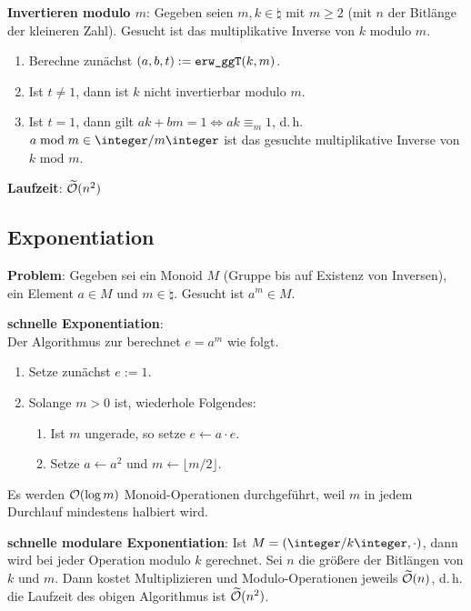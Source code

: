\linie

\textbf{Invertieren modulo $m$}:
Gegeben seien $m, k \in \natural$ mit $m \ge 2$ (mit $n$ der Bitlänge der kleineren Zahl).
Gesucht ist das multiplikative Inverse von $k$ modulo $m$.
\begin{enumerate}
    \item
    Berechne zunächst $(a, b, t) := \texttt{erw\_ggT}(k, m)$.
    
    \item
    Ist $t \not= 1$, dann ist $k$ nicht invertierbar modulo $m$.
    
    \item
    Ist $t = 1$, dann gilt $ak + bm = 1 \iff ak \equiv_m 1$,
    d.\,h. $a \bmod m \in \ZmZ$ ist das gesuchte multiplikative Inverse von $k$ mod $m$.
\end{enumerate}

\textbf{Laufzeit}:
$\widetilde{\mathcal{O}}(n^2)$

\pagebreak

\subsection{%
    Exponentiation%
}

\textbf{Problem}:
Gegeben sei ein Monoid $M$ (Gruppe bis auf Existenz von Inversen), ein Element $a \in M$ und
$m \in \natural$.
Gesucht ist $a^m \in M$.

\textbf{schnelle Exponentiation}:\\
Der Algorithmus zur  berechnet $e = a^m$ wie folgt.
\begin{enumerate}
    \item
    Setze zunächst $e := 1$.
    
    \item
    Solange $m > 0$ ist, wiederhole Folgendes:
    \begin{enumerate}
        \item
        Ist $m$ ungerade, so setze $e \leftarrow a \cdot e$.
        
        \item
        Setze $a \leftarrow a^2$ und $m \leftarrow \lfloor m/2\rfloor$.
    \end{enumerate}
\end{enumerate}
Es werden $\mathcal{O}(\log m)$ Monoid-Operationen durchgeführt,
weil $m$ in jedem Durchlauf mindestens halbiert wird.

\textbf{schnelle modulare Exponentiation}:
Ist $M = (\ZkZ, \cdot)$, dann wird bei jeder Operation modulo $k$ gerechnet.
Sei $n$ die größere der Bitlängen von $k$ und $m$.
Dann kostet Multiplizieren und Modulo-Operationen jeweils $\widetilde{\mathcal{O}}(n)$,
d.\,h. die Laufzeit des obigen Algorithmus ist $\widetilde{\mathcal{O}}(n^2)$.

